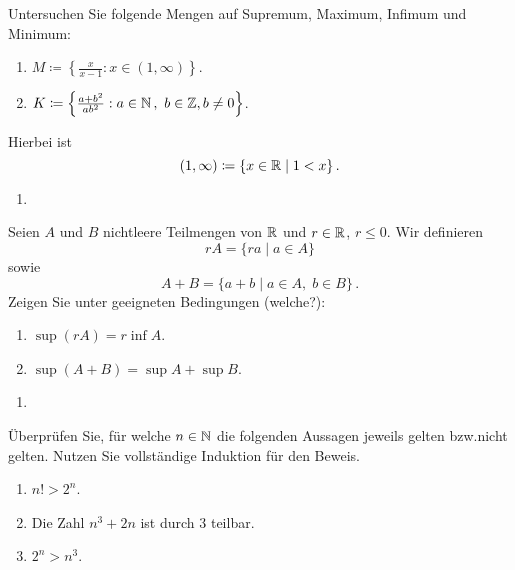 \bigskip

\begin{aufg}[6 Punkte]
Untersuchen Sie folgende Mengen auf Supremum, Maximum, Infimum und Minimum:
\begin{enumerate}[label=$\mathrm{(\roman*)}$, ref=$\mathrm{\roman*}$]
\item $M\coloneqq \left\{ \frac{x}{x-1} : x\in (1,\infty) \right\}$.
\item $K\coloneqq \left\{ \frac{a+b^2}{ab^2} : a\in\mathbb{N}\,,\ b\in\mathbb{Z}, b\not=0\right\}$.
\end{enumerate}
Hierbei ist 
\[
 (1,\infty) \coloneqq \{ x\in \mathbb{R} \mid 1<x \}\,.
\]
\end{aufg}
 
\bigskip

\begin{lsg}
\begin{enumerate}[label=$\mathrm{(\roman*)}$, ref=$\mathrm{\roman*}$]
\item 
\end{enumerate}
\end{lsg}


\bigskip


\begin{aufg}[6 Punkte]
Seien $A$ und $B$ nichtleere Teilmengen von $\mathbb{R}$ und $r\in\mathbb{R}$, $r\leq 0$. Wir definieren 
\[
rA = \lbrace ra \mid a\in A\rbrace
\]
sowie
\[
A+B = \lbrace a+b \mid a\in A, \; b\in B \rbrace\,.
\]
Zeigen Sie unter geeigneten Bedingungen (welche?):
\begin{enumerate}[label=$\mathrm{(\roman*)}$, ref=$\mathrm{\roman*}$]
\item $\sup(rA) = r\inf A$.
\item $\sup(A+B) = \sup A + \sup B$.
\end{enumerate}
\end{aufg}


\bigskip

\begin{lsg}
\begin{enumerate}[label=$\mathrm{(\roman*)}$, ref=$\mathrm{\roman*}$]
\item 
\end{enumerate}
\end{lsg}


\bigskip


\begin{aufg}[6 Punkte] \"Uberpr\"ufen Sie, f\"ur welche $n\in\mathbb{N}$ die folgenden Aussagen jeweils gelten bzw.\@ nicht gelten. Nutzen Sie vollst\"andige Induktion f\"ur den Beweis.
\begin{enumerate}[label=$\mathrm{(\roman*)}$, ref=$\mathrm{\roman*}$]
\item $n!>2^n$.
\item Die Zahl $n^3+2n$ ist durch $3$ teilbar.
\item $2^n > n^3$.
\end{enumerate}
\end{aufg}
 
